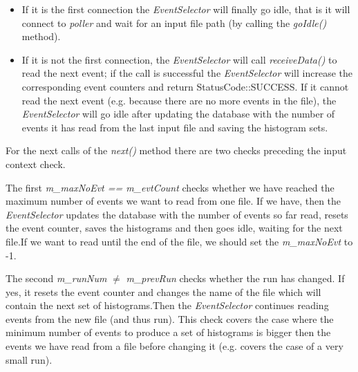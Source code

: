 \begin{itemize}
\item If it is the first connection the \textit{EventSelector} will finally go idle, that is it will connect to \textit{poller} and wait for an input file path (by calling the \textit{goIdle()} method).\par
\item If it is not the first connection, the \textit{EventSelector} will call \textit{receiveData()} to read the next event; if the call is successful the \textit{EventSelector} will increase the corresponding event counters and return StatusCode::SUCCESS. If it cannot read the next event (e.g. because there are no more events in the file), the \textit{EventSelector} will go idle after updating the database with the number of events it has read from the last input file and saving the histogram sets.\par
\end{itemize}
For the next calls of the  \textit{next()} method there are two checks preceding the input context check.\par
The first \textit{m\_maxNoEvt == m\_evtCount} checks whether we have reached the maximum number of events we want to read from one file. If we have, then the \textit{EventSelector} updates the database with the number of events so far read, resets the event counter, saves the histograms and then goes idle, waiting for the next file.If we want to read until the end of the file, we should set the \textit{m\_maxNoEvt} to -1.\par
The second \textit{m\_runNum} $\neq$ \textit{m\_prevRun} checks whether the run has changed. If yes, it resets the event counter and changes the name of the file which will contain the next set of histograms.Then the \textit{EventSelector} continues reading events from the new file (and thus run). This check covers the case where the minimum number of events to produce a set of histograms is bigger then the events we have read from a file before changing it (e.g. covers the case of a very small run).\par
